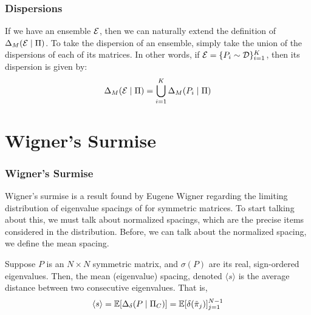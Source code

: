 \begin{frame} \frametitle{Dispersions}

\begin{alertblock}{}
If we have an ensemble $\mathcal{E}$, then we can naturally extend the definition of $\Delta_M(\mathcal{E} \mid \Pi)$.
To take the dispersion of an ensemble, simply take the union of the dispersions of each of its matrices.
In other words, if $\mathcal{E} = \{P_i \sim \mathcal{D}\}_{i = 1}^K$, then its dispersion is given by:
$$\Delta_M(\mathcal{E} \mid \Pi) = \bigcup_{i=1}^K \Delta_M(P_i \mid \Pi)$$
\end{alertblock}

\end{frame}


\section{Wigner's Surmise}

\begin{frame} \frametitle{Wigner's Surmise}

Wigner's surmise is a result found by Eugene Wigner regarding the limiting distribution of eigenvalue spacings of for symmetric matrices.
To start talking about this, we must talk about normalized spacings, which are the precise items considered in the distribution.
Before, we can talk about the normalized spacing, we define the mean spacing.

\begin{alertblock}{}
Suppose $P$ is an $N \times N$ symmetric matrix, and $\sigma(P)$ are its real, sign-ordered eigenvalues.
Then, the mean (eigenvalue) spacing, denoted $\langle s \rangle$ is the average distance between two consecutive eigenvalues. That is,
$$\langle s \rangle = \mathbb{E}[\Delta_\delta(P \mid \Pi_C)] = \mathbb{E}[\delta({\tilde{\pi}}_{j})]_{j = 1}^{N - 1}$$
\end{alertblock}

\end{frame}


